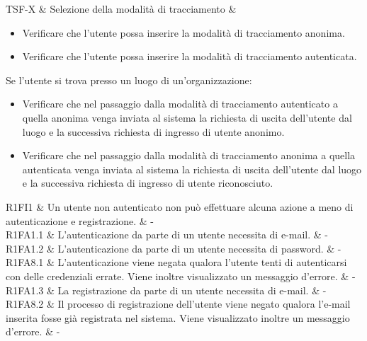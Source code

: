 TSF-X & Selezione della modalità di tracciamento & \begin{itemize}
    \item Verificare che l'utente possa inserire la modalità di tracciamento anonima.
    \item Verificare che l'utente possa inserire la modalità di tracciamento autenticata.
\end{itemize}
Se l'utente si trova presso un luogo di un'organizzazione:
\begin{itemize}
    \item Verificare che nel passaggio dalla modalità di tracciamento autenticato a quella anonima venga inviata al sistema la richiesta di uscita dell'utente dal luogo e la successiva richiesta di ingresso di utente anonimo.
    \item Verificare che nel passaggio dalla modalità di tracciamento anonima a quella autenticata venga inviata al sistema la richiesta di uscita dell'utente dal luogo e la successiva richiesta di ingresso di utente riconosciuto.
\end{itemize}









R1FI1 & Un utente non autenticato non può effettuare alcuna azione a meno di autenticazione e registrazione. & - \\

R1FA1.1 & L'autenticazione da parte di un utente necessita di e-mail. & - \\

R1FA1.2 & L'autenticazione da parte di un utente necessita di password.  & - \\

R1FA8.1 & L'autenticazione viene negata qualora l'utente tenti di autenticarsi con delle credenziali errate. Viene inoltre visualizzato un messaggio d'errore. & - \\

R1FA1.3 & La registrazione da parte di un utente necessita di e-mail. & - \\

R1FA8.2 & Il processo di registrazione dell'utente viene negato qualora l'e-mail inserita fosse già registrata nel sistema. Viene visualizzato inoltre un messaggio d'errore. & - \\

